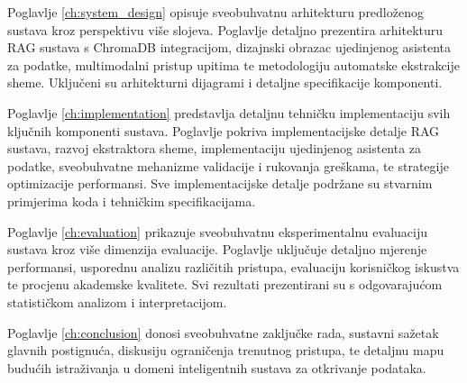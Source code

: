 Poglavlje \ref{ch:system_design} opisuje sveobuhvatnu arhitekturu predloženog sustava kroz perspektivu više slojeva. Poglavlje detaljno prezentira arhitekturu RAG sustava s ChromaDB integracijom, dizajnski obrazac ujedinjenog asistenta za podatke, multimodalni pristup upitima te metodologiju automatske ekstrakcije sheme. Uključeni su arhitekturni dijagrami i detaljne specifikacije komponenti.

Poglavlje \ref{ch:implementation} predstavlja detaljnu tehničku implementaciju svih ključnih komponenti sustava. Poglavlje pokriva implementacijske detalje RAG sustava, razvoj ekstraktora sheme, implementaciju ujedinjenog asistenta za podatke, sveobuhvatne mehanizme validacije i rukovanja greškama, te strategije optimizacije performansi. Sve implementacijske detalje podržane su stvarnim primjerima koda i tehničkim specifikacijama.

Poglavlje \ref{ch:evaluation} prikazuje sveobuhvatnu eksperimentalnu evaluaciju sustava kroz više dimenzija evaluacije. Poglavlje uključuje detaljno mjerenje performansi, usporednu analizu različitih pristupa, evaluaciju korisničkog iskustva te procjenu akademske kvalitete. Svi rezultati prezentirani su s odgovarajućom statističkom analizom i interpretacijom.

Poglavlje \ref{ch:conclusion} donosi sveobuhvatne zaključke rada, sustavni sažetak glavnih postignuća, diskusiju ograničenja trenutnog pristupa, te detaljnu mapu budućih istraživanja u domeni inteligentnih sustava za otkrivanje podataka.